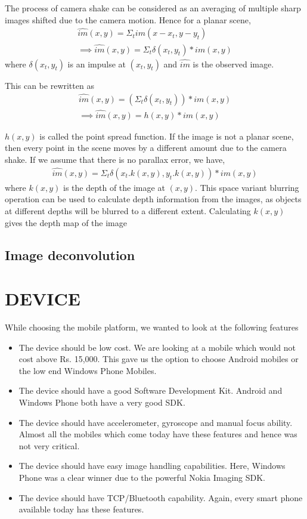 \documentclass[BTech]{iitmdiss}
\begin{document}
The process of camera shake can be considered as an averaging of 
multiple sharp images shifted due to the camera motion. Hence for a 
planar scene, 
\begin{align*}
\hat{im}(x,y) = \Sigma_tim(x-x_t,y-y_t)\\
\implies\hat{im}(x,y) = \Sigma_t\delta(x_t, y_t)*im(x,y)
\end{align*}
where $\delta(x_t, y_t)$ is an impulse at $(x_t, y_t)$ and $\hat{im}$ is
the observed image.

This can be rewritten as
\begin{align*}
\hat{im}(x,y) = (\Sigma_t\delta(x_t, y_t))*im(x,y)\\
\implies \hat{im}(x,y) = h(x,y)*im(x,y)
\end{align*}

$h(x,y)$ is called the point spread function. If the image is not a 
planar scene, then every point in the scene moves by a different amount
due to the camera shake. If we assume that there is no parallax error,
we have,
\begin{align*}
\hat{im}(x,y) = \Sigma_t\delta(x_t.k(x,y), y_t.k(x,y))*im(x,y)
\end{align*}
where $k(x,y)$ is the depth of the image at $(x,y)$. This space variant
blurring operation can be used to calculate depth information from the 
images, as objects at different depths will be blurred to a different
extent. Calculating $k(x,y)$ gives the depth map of the image

\section{Image deconvolution}
\label{basic_theory:deconv}


\chapter{DEVICE}
\label{chap:device}
While choosing the mobile platform, we wanted to look at the following
features
\begin{itemize}
\item The device should be low cost. We are looking at a mobile which
would not cost above Rs. 15,000. This gave us the option to choose 
Android mobiles or the low end Windows Phone Mobiles.
\item The device should have a good Software Development Kit. Android
and Windows Phone both have a very good SDK.
\item The device should have accelerometer, gyroscope and manual focus
ability. Almost all the mobiles which come today have these features 
and hence was not very critical.
\item The device should have easy image handling capabilities. Here, 
Windows Phone was a clear winner due to the powerful Nokia Imaging SDK.
\item The device should have TCP/Bluetooth capability. Again, every 
smart phone available today has these features. 
\end{itemize}
 
\end{document}
